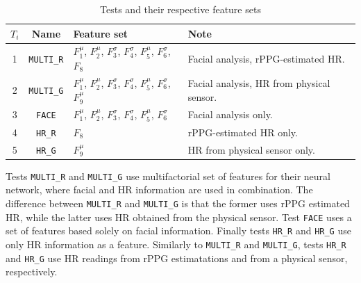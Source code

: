 \begin{table}
    \centering
    \caption{Tests and their respective feature sets}
    \label{table:study5-different-feature-sets}
    \begin{tabular}[l]{@{}cclp{4.0cm}}
        \toprule%
            \textbf{$T_i$} & \textbf{Name} & \textbf{Feature set} & \textbf{Note} \\
        \midrule%
            1 & \texttt{MULTI\_R} & $F_1^\mu$, $F_2^\mu$, $F_3^\sigma$, $F_4^\sigma$, $F_5^\mu$, $F_6^\sigma$, $F_8$ & Facial analysis, rPPG-estimated HR.\\ %
            2 & \texttt{MULTI\_G} & $F_1^\mu$, $F_2^\mu$, $F_3^\sigma$, $F_4^\sigma$, $F_5^\mu$, $F_6^\sigma$, $F_9^\mu$ & Facial analysis, HR from physical sensor.\\ %
            3 & \texttt{FACE} & $F_1^\mu$, $F_2^\mu$, $F_3^\sigma$, $F_4^\sigma$, $F_5^\mu$, $F_6^\sigma$ & Facial analysis only. \\ %
            4 & \texttt{HR\_R} & $F_8$ & rPPG-estimated HR only.\\ %
            5 & \texttt{HR\_G} & $F_9^\mu$ & HR from physical sensor only. \\ %
        \bottomrule%
    \end{tabular}
\end{table}

Tests \texttt{MULTI\_R} and \texttt{MULTI\_G} use multifactorial set of features for their neural network, where facial and HR information are used in combination. The difference between \texttt{MULTI\_R} and \texttt{MULTI\_G} is that the former uses rPPG estimated HR, while the latter uses HR obtained from the physical sensor. Test \texttt{FACE} uses a set of features based solely on facial information. Finally tests \texttt{HR\_R} and \texttt{HR\_G} use only HR information as a feature. Similarly to \texttt{MULTI\_R} and \texttt{MULTI\_G}, tests \texttt{HR\_R} and \texttt{HR\_G} use HR readings from rPPG estimatations and from a physical sensor, respectively.

